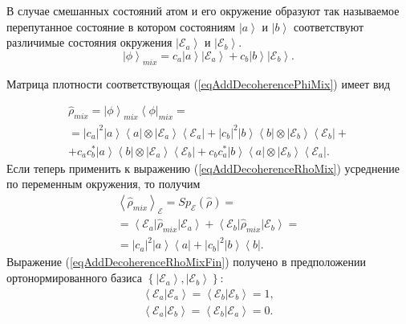 В случае смешанных состояний атом и его окружение образуют так
называемое перепутанное состояние в котором состояниям
$\left|a\right>$ и $\left|b\right>$ соответствуют различимые 
состояния окружения $\left|\mathcal{E}_a\right>$ и
$\left|\mathcal{E}_b\right>$.
\begin{equation}
\left|\phi\right>_{mix} = c_a\left|a\right> \left|\mathcal{E}_a\right>
+ c_b\left|b\right> \left|\mathcal{E}_b\right>.
\label{eqAddDecoherencePhiMix}
\end{equation}

Матрица плотности соответствующая (\ref{eqAddDecoherencePhiMix}) имеет вид

\begin{eqnarray}
\hat{\rho}_{mix} = \left|\phi\right>_{mix}\left<\phi\right|_{mix} = 
\nonumber \\
= 
\left|c_a\right|^2 \left|a\right>\left<a\right| \otimes
\left|\mathcal{E}_a\right>\left<\mathcal{E}_a\right| + 
\left|c_b\right|^2 \left|b\right>\left<b\right| \otimes
\left|\mathcal{E}_b\right>\left<\mathcal{E}_b\right| +
\nonumber \\
+
c_a c_b^{\ast}\left|a\right>\left<b\right| \otimes
\left|\mathcal{E}_a\right>\left<\mathcal{E}_b\right| +
c_b c_a^{\ast}\left|b\right>\left<a\right| \otimes
\left|\mathcal{E}_b\right>\left<\mathcal{E}_a\right|.
\label{eqAddDecoherenceRhoMix}
\end{eqnarray}
Если теперь применить к выражению (\ref{eqAddDecoherenceRhoMix})
усреднение по переменным окружения, то получим
\begin{eqnarray}
\left<\hat{\rho}_{mix}\right>_{\mathcal{E}} = 
Sp_{\mathcal{E}}\left(\hat{\rho}\right) = 
\nonumber \\
=
\left<\mathcal{E}_a\right|\hat{\rho}_{mix}\left|\mathcal{E}_a\right> +
\left<\mathcal{E}_b\right|\hat{\rho}_{mix}\left|\mathcal{E}_b\right>
= 
\nonumber \\
= \left|c_a\right|^2 \left|a\right>\left<a\right| + 
\left|c_b\right|^2 \left|b\right>\left<b\right|.
\label{eqAddDecoherenceRhoMixFin}
\end{eqnarray}
Выражение  (\ref{eqAddDecoherenceRhoMixFin}) получено в предположении
ортонормированного базиса $\left\{\left|\mathcal{E}_a\right>,
\left|\mathcal{E}_b\right>\right\}$: 
\begin{eqnarray}
\left<\mathcal{E}_a\right.\left|\mathcal{E}_a\right> = 
\left<\mathcal{E}_b\right.\left|\mathcal{E}_b\right> = 1,
\nonumber \\
\left<\mathcal{E}_a\right.\left|\mathcal{E}_b\right> = 
\left<\mathcal{E}_b\right.\left|\mathcal{E}_a\right> = 0.
\label{eqAddDecoherenceMixECond}
\end{eqnarray}


